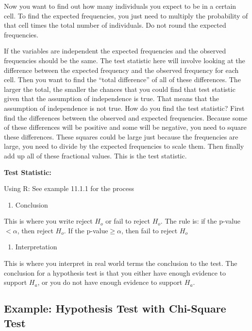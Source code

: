 \documentclass[
]{book}
\providecommand{\tightlist}{%
  \setlength{\itemsep}{0pt}\setlength{\parskip}{0pt}}
\begin{document}
Now you want to find out how many individuals you expect to be in a certain cell. To find the expected frequencies, you just need to multiply the probability of that cell times the total number of individuals. Do not round the expected frequencies.

If the variables are independent the expected frequencies and the observed frequencies should be the same. The test statistic here will involve looking at the difference between the expected frequency and the observed frequency for each cell. Then you want to find the ``total difference'' of all of these differences. The larger the total, the smaller the chances that you could find that test statistic given that the assumption of independence is true. That means that the assumption of independence is not true. How do you find the test statistic? First find the differences between the observed and expected frequencies. Because some of these differences will be positive and some will be negative, you need to square these differences. These squares could be large just because the frequencies are large, you need to divide by the expected frequencies to scale them. Then finally add up all of these fractional values. This is the test statistic.

\textbf{Test Statistic:}

Using R: See example 11.1.1 for the process

\begin{enumerate}
\def\labelenumi{\arabic{enumi}.}
\setcounter{enumi}{3}
\tightlist
\item
  Conclusion
\end{enumerate}

This is where you write reject \(H_o\) or fail to reject \(H_o\). The rule is: if the p-value \(<\alpha\), then reject \(H_o\). If the p-value\(\ge \alpha\), then fail to reject \(H_o\)

\begin{enumerate}
\def\labelenumi{\arabic{enumi}.}
\setcounter{enumi}{4}
\tightlist
\item
  Interpretation
\end{enumerate}

This is where you interpret in real world terms the conclusion to the test. The conclusion for a hypothesis test is that you either have enough evidence to support \(H_a\), or you do not have enough evidence to support \(H_a\).

\hypertarget{example-hypothesis-test-with-chi-square-test}{%
\subsection{Example: Hypothesis Test with Chi-Square Test}\label{example-hypothesis-test-with-chi-square-test}}
\end{document}
